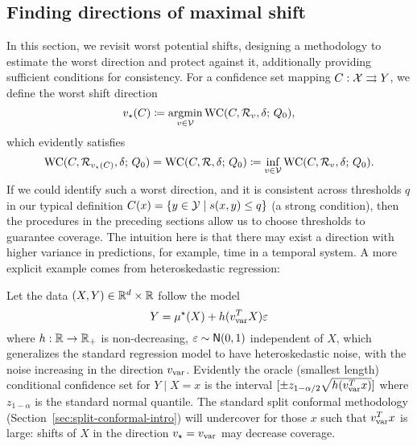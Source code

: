 
\subsection{Finding directions of maximal shift}

In this section, we revisit worst potential shifts, designing a
methodology to estimate the worst direction and protect
against it, additionally providing sufficient conditions for consistency.
For a confidence
set mapping $C : \mathcal{X} \rightrightarrows {Y}$, we define the worst shift direction
\begin{equation}
  v_\star(C) \coloneqq \mathop{\rm argmin}_{v \in \mathcal{V}} \textup{WC}(C, \mathcal{R}_v, \delta; \, Q_0),
  \label{eqn:worst-shift-def}
\end{equation}
which evidently satisfies
\begin{equation*}
  \textup{WC}(C, \mathcal{R}_{v_\star(C)}, \delta; \, Q_0) 
  = \textup{WC}(C, \mathcal{R}, \delta; \, Q_0) 
  \coloneqq \inf_{v \in \mathcal{V}} \textup{WC}(C, \mathcal{R}_{v}, \delta; \, Q_0).
\end{equation*}
If we could identify such a worst direction, and it is consistent across
thresholds $q$ in our typical definition $C(x) = \{y \in \mathcal{Y} \mid
s(x, y) \le q\}$ (a strong condition), then the procedures in the
preceding sections allow us to choose thresholds to guarantee coverage.
The intuition here is that there may exist a direction with
higher variance in predictions, for example, time in a temporal system.
A more explicit example comes from heteroskedastic regression:

\begin{example}
  \label{example:heterogeneous-regression}
  Let the data $(X, Y) \in \mathbb{R}^d \times \mathbb{R}$ follow the model
  \begin{equation*}
    Y = \mu^\star(X) + h(v_{\textup{var}}^T X) \varepsilon
  \end{equation*}
  where $h : \mathbb{R} \to \mathbb{R}_+$ is non-decreasing, $\varepsilon \sim \mathsf{N}(0,1)$
  independent of $X$, which generalizes the standard regression model
  to have heteroskedastic noise, with the noise increasing in the
  direction $v_{\textup{var}}$. Evidently the oracle (smallest length) conditional
  confidence set for $Y \mid X = x$ is the
  interval $[\pm z_{1 - \alpha/2} \sqrt{h(v_{\textup{var}}^T x)}]$ where $z_{1 - \alpha}$
  is the standard normal quantile. The standard split
  conformal methodology (Section~\ref{sec:split-conformal-intro})
  will undercover for those $x$ such that $v_{\textup{var}}^T x$ is large: shifts
  of $X$ in the direction $v_\star = v_{\textup{var}}$ may decrease coverage.
\end{example}

